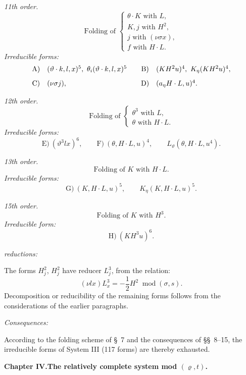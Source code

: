 \documentclass[11pt]{article}
\newcommand{\modu}[1]{\;\operatorname{mod} #1}
\begin{document}
\noindent\emph{11th order.}
\[
\text{Folding of }\left\{\begin{array}{l}
\theta\cdot K\text{ with }L,\\
K,j\text{ with }H^2,\\
j\text{ with }(\nu\sigma x),\\
f\text{ with }H\cdot L.
\end{array}\right.
\]
\noindent\emph{Irreducible forms:}
\[
\begin{array}{c@{\quad}l@{\qquad}c@{\quad}l}
\text{A)}&(\vartheta\cdot k,l,x)^5,
\ \theta_i(\vartheta\cdot k,l,x)^5&
\text{B)}&(KH^2u)^4,
\ K_\eta(KH^2u)^4,\\[0.8em]
\text{C)}&(\nu\sigma j),&
\text{D)}&(a_\eta H\cdot L,u)^4.
\end{array}
\]

\noindent\emph{12th order.}
\[
\text{Folding of }\left\{\begin{array}{l}
\theta^3\text{ with }L,\\
\theta\text{ with }H\cdot L.
\end{array}\right.
\]
\noindent\emph{Irreducible forms:}
\[
\text{E)}\ (\vartheta^3lx)^6,
\qquad
\text{F)}\ (\theta,H\cdot L,u)^4,
\qquad L_\vartheta(\theta,H\cdot L,u^4).
\]

\noindent\emph{13th order.}
\[
\text{Folding of }K\text{ with }H\cdot L.
\]
\noindent\emph{Irreducible forms:}
\[
\text{G)}\ (K,H\cdot L,u)^5,
\qquad K_\eta(K,H\cdot L,u)^5.
\]

\noindent\emph{15th order.}
\[
\text{Folding of }K\text{ with }H^3.
\]
\noindent\emph{Irreducible form:}
\[
\text{H)}\ (KH^3u)^6.
\]

\noindent\emph{reductions:}

The forms $H_j^2$, $H_j^2$ have reducer $L_j^3$, from the relation:
\[
(\nu lx)L_x^3=-\frac12H^2\modu{(\sigma,s)}.
\]
Decomposition or reducibility of the remaining forms follows from the considerations of the earlier paragraphs.

\noindent\emph{Consequences:}

According to the folding scheme of \S\ 7 and the consequences of \S\S\ 8--15, the irreducible forms of System III (117 forms) are thereby exhausted.



\clearpage

\begin{center}
{\Large\bfseries Chapter IV.\quad The relatively complete system mod $(\varrho,t)$.}
\end{center}
\end{document}
